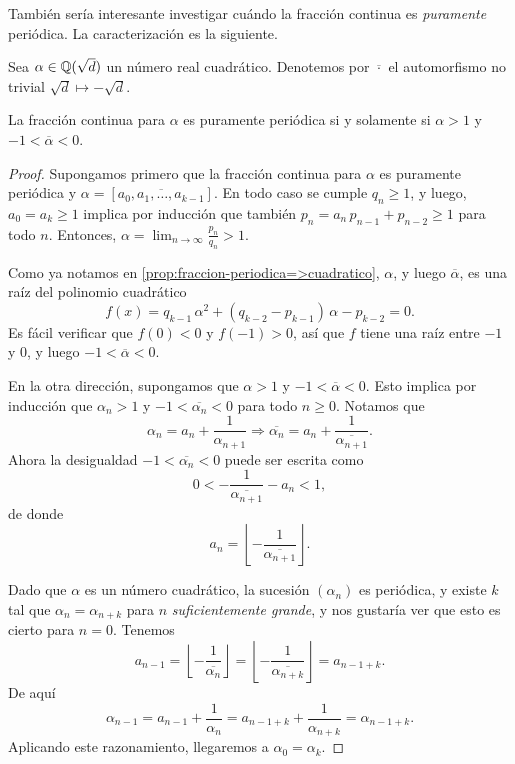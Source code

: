 También sería interesante investigar cuándo la fracción continua es
\emph{puramente} periódica. La caracterización es la siguiente.

\begin{teorema}
  Sea $\alpha \in \mathbb{Q} (\sqrt{d})$ un número real cuadrático. Denotemos por
  $\overline{\cdot}$ el automorfismo no trivial $\sqrt{d} \mapsto -\sqrt{d}$.

  La fracción continua para $\alpha$ es puramente periódica si y solamente si
  $\alpha > 1$ y $-1 < \overline{\alpha} < 0$.

  \begin{proof}
    Supongamos primero que la fracción continua para $\alpha$ es puramente
    periódica y $\alpha = [\overline{a_0,a_1,\ldots,a_{k-1}}]$. En todo caso se
    cumple $q_n \ge 1$, y luego, $a_0 = a_k \ge 1$ implica por inducción que
    también $p_n = a_n\,p_{n-1} + p_{n-2} \ge 1$ para todo $n$. Entonces,
    $\alpha = \lim_{n\to\infty} \frac{p_n}{q_n} > 1$.

    Como ya notamos en \ref{prop:fraccion-periodica=>cuadratico}, $\alpha$,
    y luego $\overline{\alpha}$, es una raíz del polinomio cuadrático
    $$f (x) = q_{k-1}\,\alpha^2 + (q_{k-2} - p_{k-1})\,\alpha - p_{k-2} = 0.$$
    Es fácil verificar que $f (0) < 0$ y $f (-1) > 0$, así que $f$ tiene una raíz
    entre $-1$ y $0$, y luego $-1 < \overline{\alpha} < 0$.

    \vspace{1em}

    En la otra dirección, supongamos que $\alpha > 1$ y
    $-1 < \overline{\alpha} < 0$. Esto implica por inducción que $\alpha_n > 1$
    y $-1 < \overline{\alpha_n} < 0$ para todo $n \ge 0$. Notamos que
    \[ \alpha_n = a_n + \frac{1}{\alpha_{n+1}} \Longrightarrow
       \overline{\alpha_n} = a_n + \frac{1}{\overline{\alpha_{n+1}}}. \]
    Ahora la desigualdad $-1 < \overline{\alpha_n} < 0$ puede ser escrita como
    $$0 < -\frac{1}{\overline{\alpha_{n+1}}} - a_n < 1,$$
    de donde
    $$a_n = \left\lfloor-\frac{1}{\overline{\alpha_{n+1}}}\right\rfloor.$$

    Dado que $\alpha$ es un número cuadrático, la sucesión $(\alpha_n)$ es
    periódica, y existe $k$ tal que $\alpha_n = \alpha_{n+k}$ para $n$
    \emph{suficientemente grande}, y nos gustaría ver que esto es cierto para
    $n = 0$. Tenemos
    \[ a_{n-1} = \left\lfloor-\frac{1}{\overline{\alpha_n}}\right\rfloor =
       \left\lfloor-\frac{1}{\overline{\alpha_{n+k}}}\right\rfloor = a_{n-1+k}. \]
    De aquí
    \[ \alpha_{n-1} = a_{n-1} + \frac{1}{\alpha_n} =
       a_{n-1+k} + \frac{1}{\alpha_{n+k}} = \alpha_{n-1+k}. \]
    Aplicando este razonamiento, llegaremos a $\alpha_0 = \alpha_k$.
  \end{proof}
\end{teorema}

